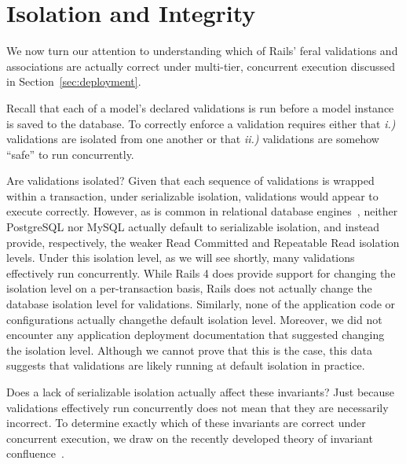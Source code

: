 
\section{Isolation and Integrity}
\label{sec:apps}

We now turn our attention to understanding which of Rails' feral
validations and associations are actually correct under multi-tier,
concurrent execution discussed in Section~\ref{sec:deployment}.

Recall that each of a model's declared validations is run before a
model instance is saved to the database. To correctly enforce a
validation requires either that \textit{i.)} validations are isolated
from one another or that \textit{ii.)} validations are somehow
``safe'' to run concurrently.

Are validations isolated? Given that each sequence of validations is
wrapped within a transaction, under serializable isolation,
validations would appear to execute correctly. However, as is common
in relational database engines~\cite{hat-vldb}, neither PostgreSQL nor
MySQL actually default to serializable isolation, and instead provide,
respectively, the weaker Read Committed and Repeatable Read isolation
levels. Under this isolation level, as we will see shortly, many
validations effectively run concurrently. While Rails 4 does provide
support for changing the isolation level on a per-transaction basis,
Rails does not actually change the database isolation level for
validations. Similarly, none of the application code or configurations
actually changethe default isolation level. Moreover, we did not
encounter any application deployment documentation that suggested
changing the isolation level. Although we cannot prove that this is
the case, this data suggests that validations are likely running at
default isolation in practice.

Does a lack of serializable isolation actually affect these
invariants? Just because validations effectively run concurrently does
not mean that they are necessarily incorrect. To determine exactly
which of these invariants are correct under concurrent execution, we
draw on the recently developed theory of invariant
confluence~\cite{coord-avoid}.


